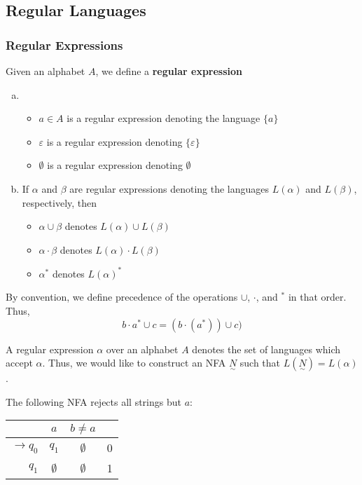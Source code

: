 \subsection{Regular Languages}\label{subsec:regular-languages}

\subsubsection{Regular Expressions}
\begin{definition}
Given an alphabet $A$, we define a \textbf{regular expression}
\begin{enumerate}[(a)]
    \item \begin{itemize}
        \item $a\in A$ is a regular expression denoting the language $\{a\}$
        \item $\varepsilon$ is a regular expression denoting $\{\varepsilon\}$
        \item $\emptyset$ is a regular expression denoting $\emptyset$
    \end{itemize}
    
    \item If $\alpha$ and $\beta$ are regular expressions denoting the languages $L(\alpha)$ and $L(\beta)$, respectively, then 
    \begin{itemize}
        \item $\alpha\cup\beta$ denotes $L(\alpha)\cup L(\beta)$
        \item $\alpha\cdot\beta$ denotes $L(\alpha)\cdot L(\beta)$
        \item $\alpha^*$ denotes $L(\alpha)^*$
    \end{itemize}
\end{enumerate}
\end{definition}

By convention, we define precedence of the operations $\cup$, $\cdot$, and $^*$ in that order. Thus, \[b\cdot a^*\cup c=(b\cdot(a^*))\cup c)\]

A regular expression $\alpha$ over an alphabet $A$ denotes the set of languages which accept $\alpha$. Thus, we would like to construct an NFA $\underset{\sim}{N}$ such that $L(\underset{\sim}{N})=L(\alpha)$.

The following NFA rejects all strings but $a$:

\begin{center}\begin{tabular}{r| c c r}
      & $a$ & $b\neq a$ & \\\hline
      $\to q_0$ & $q_1$ & $\emptyset$ & 0\\
            $q_1$ & $\emptyset$ & $\emptyset$ & 1\\
 \end{tabular}\end{center}

